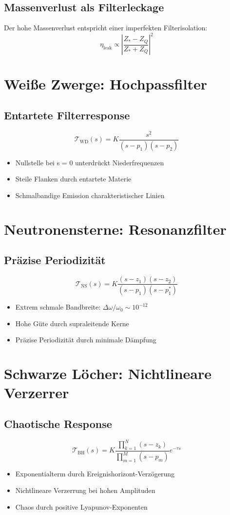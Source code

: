 \subsection{Massenverlust als Filterleckage}
Der hohe Massenverlust entspricht einer imperfekten Filterisolation:
\[
\eta_{\text{leak}} \propto \left|\frac{Z_* - Z_Q}{Z_* + Z_Q}\right|^2
\]

\section{Weiße Zwerge: Hochpassfilter}

\subsection{Entartete Filterresponse}
\[
\mathcal{T}_{\text{WD}}(s) = K\frac{s^2}{(s - p_1)(s - p_2)}
\]
\begin{itemize}
\item Nullstelle bei s = 0 unterdrückt Niederfrequenzen
\item Steile Flanken durch entartete Materie
\item Schmalbandige Emission charakteristischer Linien
\end{itemize}

\section{Neutronensterne: Resonanzfilter}

\subsection{Präzise Periodizität}
\[
\mathcal{T}_{\text{NS}}(s) = K\frac{(s - z_1)(s - z_2)}{(s - p_1)(s - p_1^*)}
\]
\begin{itemize}
\item Extrem schmale Bandbreite: $\Delta\omega/\omega_0 \sim 10^{-12}$
\item Hohe Güte durch supraleitende Kerne
\item Präzise Periodizität durch minimale Dämpfung
\end{itemize}

\section{Schwarze Löcher: Nichtlineare Verzerrer}

\subsection{Chaotische Response}
\[
\mathcal{T}_{\text{BH}}(s) = K\frac{\prod_{k=1}^N (s - z_k)}{\prod_{m=1}^M (s - p_m)} e^{-\tau s}
\]
\begin{itemize}
\item Exponentialterm durch Ereignishorizont-Verzögerung
\item Nichtlineare Verzerrung bei hohen Amplituden
\item Chaos durch positive Lyapunov-Exponenten
\end{itemize}

